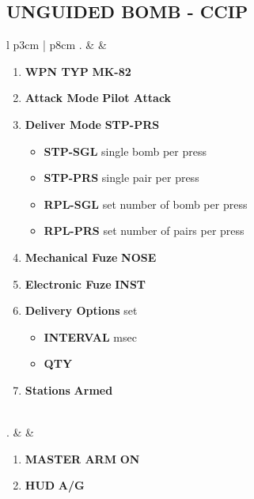 \documentclass[8pt,usenames,dvipsnames,twoside]{article}
\begin{document}
		\subsection{UNGUIDED BOMB - CCIP}
		\begin{center}
			\begin{tabular}{l p{3cm} | p{8cm}}
				. &  & 
				\begin{minipage}[t]{\linewidth}
					\vspace{-7pt}
					\begin{enumerate}[label=(\alph*)]
						\item \textbf{WPN TYP} \dotfill \textbf{MK-82}
						\item \textbf{Attack Mode} \dotfill \textbf{Pilot Attack}
						\item \textbf{Deliver Mode} \dotfill \textbf{STP-PRS}
						\begin{itemize}
							\item \textbf{STP-SGL} single bomb per press
							\item \textbf{STP-PRS} single pair per press
							\item \textbf{RPL-SGL} set number of bomb per press
							\item \textbf{RPL-PRS} set number of pairs per press
						\end{itemize}
						\item \textbf{Mechanical Fuze} \dotfill \textbf{NOSE}
						\item \textbf{Electronic Fuze} \dotfill \textbf{INST}
						\item \textbf{Delivery Options} \dotfill set 
						\begin{itemize}
							\item \textbf{INTERVAL}  msec
							\item \textbf{QTY} 
						\end{itemize}
						\item \textbf{Stations} \dotfill \textbf{Armed}
					\end{enumerate}
				\end{minipage} \\
				. &  & 
				\begin{minipage}[t]{\linewidth}
					\vspace{-7pt}
					\begin{enumerate}[label=(\alph*)]
						\item \textbf{MASTER ARM} \dotfill \textbf{ON}
						\item \textbf{HUD} \dotfill \textbf{A/G}

\end{enumerate}
\end{minipage}
\end{tabular}
\end{center}
\end{document}

